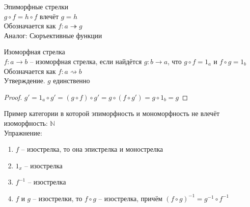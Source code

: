 \documentclass[a4paper, fleqn, draft]{report}
\begin{document}
Эпиморфные стрелки \\
$g \circ f = h \circ f$ влечёт $g = h$ \\
Обозначается как $f\colon a \twoheadrightarrow g$ \\
Аналог: Сюръективные функции

Изоморфная стрелка \\
$f\colon a \to b$ -- изоморфная стрелка, если найдётся $g\colon b \to a$, что
$g \circ f = 1_a$ и $f \circ g = 1_b$ \\
Обозначается как $f\colon a \rightsquigarrow b$ \\
Утверждение. $g$ единственно
\begin{proof}
  $g' = 1_a \circ g' = (g \circ f) \circ g' = g \circ (f \circ g') = g \circ 1_b = g$
\end{proof}

Пример категории в которой эпиморфность и мономорфность не влечёт изоморфность:
$\mathbb{N}$ \\
Упражнение: \\
\begin{enumerate}
  \item $f$ -- изострелка, то она эпистрелка и монострелка \\
  \item $1_x$ -- изострелка \\
  \item $f^{-1}$ -- изострелка \\
  \item $f$ и $g$ -- изострелки, то $f \circ g$ -- изострелка, причём
        $(f \circ g)^{-1} = g^{-1} \circ f^{-1}$ \\
\end{enumerate}
\end{document}

